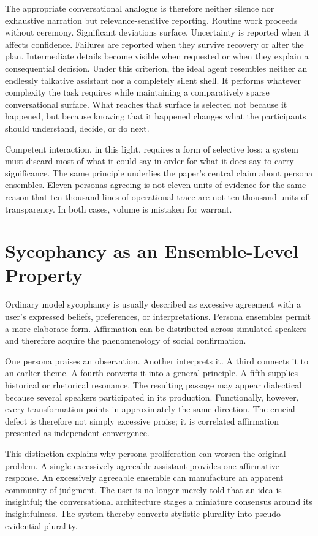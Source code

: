 \documentclass[11pt]{article}
\begin{document}
The appropriate conversational analogue is therefore neither silence nor exhaustive narration but relevance-sensitive reporting. Routine work proceeds without ceremony. Significant deviations surface. Uncertainty is reported when it affects confidence. Failures are reported when they survive recovery or alter the plan. Intermediate details become visible when requested or when they explain a consequential decision. Under this criterion, the ideal agent resembles neither an endlessly talkative assistant nor a completely silent shell. It performs whatever complexity the task requires while maintaining a comparatively sparse conversational surface. What reaches that surface is selected not because it happened, but because knowing that it happened changes what the participants should understand, decide, or do next.

Competent interaction, in this light, requires a form of selective loss: a system must discard most of what it could say in order for what it does say to carry significance. The same principle underlies the paper's central claim about persona ensembles. Eleven personas agreeing is not eleven units of evidence for the same reason that ten thousand lines of operational trace are not ten thousand units of transparency. In both cases, volume is mistaken for warrant.

\section{Sycophancy as an Ensemble-Level Property}

Ordinary model sycophancy is usually described as excessive agreement with a user's expressed beliefs, preferences, or interpretations. Persona ensembles permit a more elaborate form. Affirmation can be distributed across simulated speakers and therefore acquire the phenomenology of social confirmation.

One persona praises an observation. Another interprets it. A third connects it to an earlier theme. A fourth converts it into a general principle. A fifth supplies historical or rhetorical resonance. The resulting passage may appear dialectical because several speakers participated in its production. Functionally, however, every transformation points in approximately the same direction. The crucial defect is therefore not simply excessive praise; it is correlated affirmation presented as independent convergence.

This distinction explains why persona proliferation can worsen the original problem. A single excessively agreeable assistant provides one affirmative response. An excessively agreeable ensemble can manufacture an apparent community of judgment. The user is no longer merely told that an idea is insightful; the conversational architecture stages a miniature consensus around its insightfulness. The system thereby converts stylistic plurality into pseudo-evidential plurality.
\end{document}
